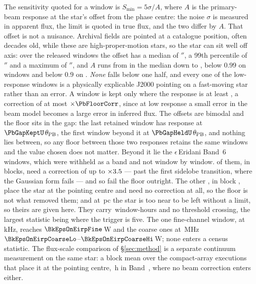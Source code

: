 The sensitivity quoted for a window is $S_{\min}=5\sigma/A$, where $A$ is the
primary-beam response at the star's offset from the phase centre: the noise
$\sigma$ is measured in apparent flux, the limit is quoted in true flux, and
the two differ by $A$. That offset is not a nuisance. Archival fields are
pointed at a catalogue position, often decades old, while these are
high-proper-motion stars, so the star can sit well off axis: over the
\PbNWin{} released windows the offset has a median of \PbOffMed$''$, a 99th
percentile of \PbOffPNN$''$ and a maximum of \PbOffMax$''$, and $A$ runs from
\PbAMed{} in the median down to \PbAMin, below $0.99$ on \PbNLowNN{} windows
and below $0.9$ on \PbNLowN. \emph{None} falls below one half, and every one
of the low-response windows is a physically explicable J2000 pointing on a
fast-moving star rather than an error. A window is kept only where the
response is at least \PbFloorResp, a correction of at most
$\times\PbFloorCorr$, since at low response a small error in the beam model
becomes a large error in inferred flux. The offsets are bimodal and the floor
sits in the gap: the last retained window has response \PbGapKeptResp{} at
$\PbGapKeptU\,\theta_{\rm PB}$, the first window beyond it \PbGapHeldResp{}
at $\PbGapHeldU\,\theta_{\rm PB}$, and nothing lies between, so any floor
between those two responses retains the same \NWindows{} windows and the
value chosen does not matter.
Beyond it lie the \EpsEriNWin{} $\epsilon$\,Eridani Band~6 windows, which
were withheld as a band and not window by window. \EpsEriNOffAxis{} of them,
in \LqEpsOffEb{} blocks, need a correction of up to
$\times3.5$ --- past the first sidelobe transition, where the
Gaussian form fails --- and so fail the floor outright. The other
\EpsEriNOnAxis, in block \texttt{\BkEpsOnBlock}, place the star at the
pointing centre and need no correction at all, so the floor is not what
removed them; and at \EpsEriDistPc\,pc the star is too near to be left
without a limit, so theirs are given here. They carry
\BkEpsOnHours\,window-hours and no threshold crossing, the largest statistic
being \BkEpsOnTMax{} where the trigger is five. The one fine-channel window,
at \BkEpsOnChanFineKHz\,kHz, reaches $\BkEpsOnEirpFine$\,W and the
\BkEpsOnNCoarse{} coarse ones at \BkEpsOnChanCoarseMHz\,MHz
$\BkEpsOnEirpCoarseLo$--$\BkEpsOnEirpCoarseHi$\,W; none enters a census
statistic. The flux-scale comparison of
\S\ref{sec:method} is a separate continuum measurement on the same star: a
block mean over the \PxEpsN{} compact-array executions that place it at the
pointing centre, \PxEpsHours\,h in Band~\PxEpsBand, where no beam correction
enters either.

